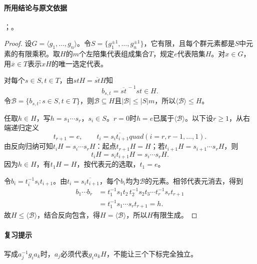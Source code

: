 \paragraph{所用结论与原文依据}
；。


\begin{proof}
设$G=\langle g_1,\ldots,g_n\rangle$。令$S=\{g_1^{\pm1},\ldots,g_n^{\pm1}\}$，它有限，且每个群元素都是$S$中元素的有限乘积。取$H$的$m$个左陪集代表组成集合$T$，规定$e$代表陪集$H$。对$x\in G$，用$\overline x\in T$表示$xH$的唯一选定代表。

对每个$s\in S,t\in T$，由$stH=\overline{st}H$知
\[
b_{s,t}=\overline{st}^{\,-1}st\in H.
\]
令$\mathcal B=\{b_{s,t}:s\in S,t\in T\}$，则$\mathcal B\subseteq H$且$|\mathcal B|\leq|S|m$，所以$\langle\mathcal B\rangle\leq H$。

任取$h\in H$，写$h=s_1\cdots s_r$，$s_i\in S$。$r=0$时$h=e$已属于$\langle\mathcal B\rangle$。以下设$r\geq1$，从右端递归定义
\[
t_{r+1}=e,\qquad t_i=\overline{s_it_{i+1}}quad(i=r,r-1,\ldots,1).
\]
由反向归纳可知$t_iH=s_i\cdots s_rH$：起点$t_{r+1}H=H$；若$t_{i+1}H=s_{i+1}\cdots s_rH$，则
\[
t_iH=s_it_{i+1}H=s_i\cdots s_rH.
\]
因为$h\in H$，有$t_1H=H$，按代表元的选取，$t_1=e$。

令$b_i=t_i^{-1}s_it_{i+1}$。由$t_i=\overline{s_it_{i+1}}$，每个$b_i$均为$\mathcal B$的元素。相邻代表元消去，得到
\begin{align*}
b_1\cdots b_r
&=t_1^{-1}s_1t_2\,t_2^{-1}s_2t_3\cdots t_r^{-1}s_rt_{r+1}\\
&=t_1^{-1}s_1\cdots s_rt_{r+1}=h.
\end{align*}
故$H\leq\langle\mathcal B\rangle$，结合反向包含，得$H=\langle\mathcal B\rangle$，所以$H$有限生成。
\end{proof}

\paragraph{复习提示}
写成$a_j^{-1}g_i a_k$时，$a_j$必须代表$g_i a_kH$，不能让三个下标完全独立。


